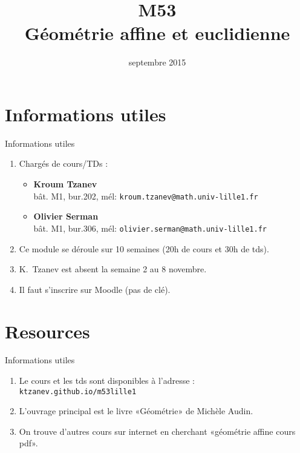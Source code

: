 \documentclass[
bigger]{m53beamer}
\title{M53\\Géométrie affine et euclidienne}
\date{septembre 2015}
\begin{document}
\begin{frame}
  \titlepage
\end{frame}

\section{Informations utiles}
\begin{frame}{Informations utiles}
  \begin{enumerate}[<+(1)->]
    \item Chargés de cours/TDs :
          \begin{itemize}
            \item \textbf{Kroum Tzanev}\\
              bât. M1, bur.202, mél: \texttt{kroum.tzanev@math.univ-lille1.fr}
            \item \textbf{Olivier Serman}\\
              bât. M1, bur.306, mél: \texttt{olivier.serman@math.univ-lille1.fr}
          \end{itemize}
    \item Ce module se déroule sur 10 semaines (20h de cours et 30h de tds).
    \item K.~Tzanev est absent la semaine 2 au 8 novembre.
    \item Il faut s'inscrire sur Moodle (pas de clé).
  \end{enumerate}
\end{frame}

\section{Resources}
\begin{frame}{Informations utiles}
  \begin{enumerate}[<+(1)->]
    \item Le cours et les tds sont disponibles à l'adresse :
      \texttt{ktzanev.github.io/m53lille1}
    \item L'ouvrage principal est le livre «Géométrie» de Michèle Audin.
    \item On trouve d'autres cours sur internet en cherchant «géométrie affine cours pdf».
  \end{enumerate}
\end{frame}
\end{document}

